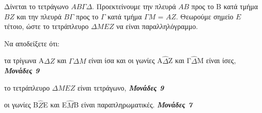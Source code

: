 \documentclass[11pt,a4paper,twoside]{book}
\newcommand{\monades}[1]{
\hspace*{\fill}
\textbf{\textit{\textcolor{maincolor}{Μονάδες #1}}}}
\begin{document}
Δίνεται το τετράγωνο $AB\varGamma \varDelta  $. Προεκτείνουμε την πλευρά $AB$ προς το Β κατά τμήμα $BZ$ και την πλευρά $B\varGamma $ προς το $\varGamma$ κατά τμήμα $\varGamma M$ = $AZ$. Θεωρούμε σημείο $E$ τέτοιο, ώστε το τετράπλευρο $\varDelta  MEZ$ να είναι παραλληλόγραμμο.

Να αποδείξετε ότι:

\begin{alist}
\item τα τρίγωνα Α$\varDelta   Z$ και $\varGamma \varDelta  M$ είναι ίσα και οι γωνίες Α$\hat{\varDelta  }$Ζ και Γ$\hat{\varDelta  }$Μ είναι ίσες, \monades{9}

\item το τετράπλευρο $\varDelta  MEZ$ είναι τετράγωνο, \monades{9}

\item οι γωνίες Β$\hat{Ζ}$Ε και Ε$\hat{Μ}$Β είναι παραπληρωματικές. \monades{7}


\begin{center}
\end{center}
\end{alist}

\vspace{4mm}
\end{document}
